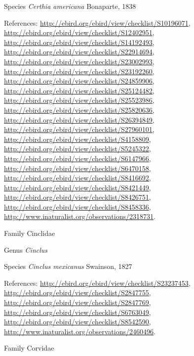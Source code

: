 \documentclass[9pt, article]{memoir}
\begin{document}
\begin{multicols}{2}
\vspace{6pt}\noindent\hspace{36pt}Species \textit{Certhia americana} Bonaparte, 1838


\vspace{6pt}References: 
\url{http://ebird.org/ebird/view/checklist/S10196071}, 
\url{http://ebird.org/ebird/view/checklist/S12402951}, 
\url{http://ebird.org/ebird/view/checklist/S14192493}, 
\url{http://ebird.org/ebird/view/checklist/S22914694}, 
\url{http://ebird.org/ebird/view/checklist/S23002993}, 
\url{http://ebird.org/ebird/view/checklist/S23192260}, 
\url{http://ebird.org/ebird/view/checklist/S24859906}, 
\url{http://ebird.org/ebird/view/checklist/S25124482}, 
\url{http://ebird.org/ebird/view/checklist/S25523986}, 
\url{http://ebird.org/ebird/view/checklist/S25820636}, 
\url{http://ebird.org/ebird/view/checklist/S26394849}, 
\url{http://ebird.org/ebird/view/checklist/S27960101}, 
\url{http://ebird.org/ebird/view/checklist/S4158809}, 
\url{http://ebird.org/ebird/view/checklist/S5245322}, 
\url{http://ebird.org/ebird/view/checklist/S6147966}, 
\url{http://ebird.org/ebird/view/checklist/S6470158}, 
\url{http://ebird.org/ebird/view/checklist/S8416692}, 
\url{http://ebird.org/ebird/view/checklist/S8421449}, 
\url{http://ebird.org/ebird/view/checklist/S8426751}, 
\url{http://ebird.org/ebird/view/checklist/S8458336}, 
\url{http://www.inaturalist.org/observations/2318731}.

\vspace{6pt}\noindent\hspace{24pt}Family Cinclidae


\vspace{6pt}\noindent\hspace{30pt}Genus \textit{Cinclus}


\vspace{6pt}\noindent\hspace{36pt}Species \textit{Cinclus mexicanus} Swainson, 1827


\vspace{6pt}References: 
\url{http://ebird.org/ebird/view/checklist/S23237453}, 
\url{http://ebird.org/ebird/view/checklist/S2847755}, 
\url{http://ebird.org/ebird/view/checklist/S2847769}, 
\url{http://ebird.org/ebird/view/checklist/S6763049}, 
\url{http://ebird.org/ebird/view/checklist/S8542590}, 
\url{http://www.inaturalist.org/observations/2460496}.

\vspace{6pt}\noindent\hspace{24pt}Family Corvidae



\end{multicols}
\end{document}
